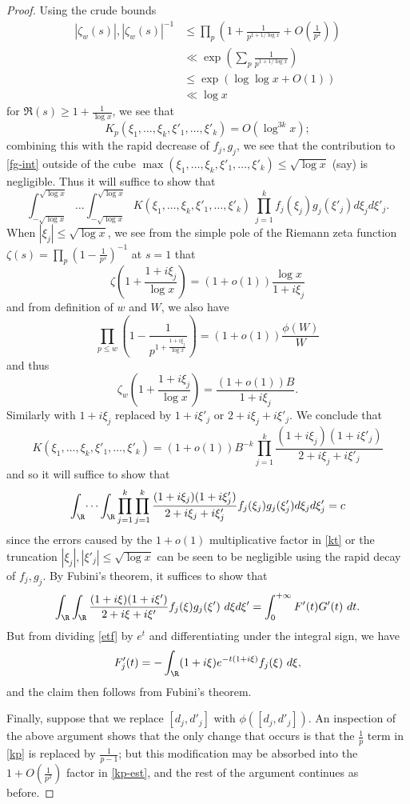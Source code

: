 \begin{proof}
Using the crude bounds
\begin{align*}
 |\zeta_w(s)|, |\zeta_w(s)|^{-1} &\leq \prod_p \left(1 + \frac{1}{p^{1+1/\log x}} + O\left(\frac{1}{p^2}\right)\right)\\
&\ll \exp\left( \sum_p \frac{1}{p^{1+1/\log x}} \right) \\
&\leq \exp( \log\log x + O(1) ) \\
&\ll \log x
\end{align*}
for $\Re(s) \geq 1 + \frac{1}{\log x}$, we see that
$$
 K_p(\xi_1,\dots,\xi_k,\xi'_1,\dots,\xi'_k) = O( \log^{3k} x );$$
combining this with the rapid decrease of $f_j, g_j$, we see that the contribution to \eqref{fg-int} outside of the cube $\max(\xi_1,\dots,\xi_k,\xi'_1,\dots,\xi'_k) \leq \sqrt{\log x}$ (say) is negligible.  Thus it will suffice to show that
$$
 \int_{-\sqrt{\log x}}^{\sqrt{\log x}} \dots \int_{-\sqrt{\log x}}^{\sqrt{\log x}} K(\xi_1,\dots,\xi_k,\xi'_1,\dots,\xi'_k)\ \prod_{j=1}^k f_j(\xi_j) g_j(\xi'_j) d\xi_j d\xi'_j.
$$
When $|\xi_j| \leq \sqrt{\log x}$, we see from the simple pole of the Riemann zeta function $\zeta(s) = \prod_p (1-\frac{1}{p^s})^{-1}$ at $s=1$ that
$$ \zeta\left(1 + \frac{1+i\xi_j}{\log x}\right) = (1+o(1)) \frac{\log x}{1+i\xi_j}$$
and from definition of $w$ and $W$, we also have
$$ \prod_{p \leq w} (1 - \frac{1}{p^{1+\frac{1+i\xi_j}{\log x}}}) = (1+o(1)) \frac{\phi(W)}{W}$$
and thus
$$ \zeta_w(1 + \frac{1+i\xi_j}{\log x}) = \frac{(1+o(1)) B}{1 + i\xi_j}.$$
Similarly with $1+i\xi_j$ replaced by $1+i\xi'_j$ or $2+i\xi_j+i\xi'_j$.  We conclude that
\begin{equation}\label{kt}
 K(\xi_1,\dots,\xi_k,\xi'_1,\dots,\xi'_k) = (1+o(1)) B^{-k} \prod_{j=1}^k \frac{(1+i\xi_j) (1+i\xi'_j)}{2+i\xi_j+i\xi'_j} 
\end{equation}
and so it will suffice to show that
$$
 \int_\R \dots \int_\R \prod_{j=1}^k \prod_{j=1}^k \frac{(1+i\xi_j) (1+i\xi'_j)}{2+i\xi_j+i\xi'_j}  f_j(\xi_j) g_j(\xi'_j) d\xi_j d\xi'_j
= c$$
since the errors caused by the $1+o(1)$ multiplicative factor in \eqref{kt} or the truncation $|\xi_j|, |\xi'_j| \leq \sqrt{\log x}$ can be seen to be negligible using the rapid decay of $f_j,g_j$.  By Fubini's theorem, it suffices to show that
$$ 
\int_\R \int_\R \frac{(1+i\xi) (1+i\xi')}{2+i\xi+i\xi'} f_j(\xi) g_j(\xi')\ d\xi d\xi' = \int_0^{+\infty} F'(t) G'(t)\ dt.$$
But from dividing \eqref{etf} by $e^t$ and differentiating under the integral sign, we have
$$F'_j(t) = - \int_\R (1+i\xi) e^{-t(1+i\xi)} f_j(\xi)\ d\xi,$$
and the claim then follows from Fubini's theorem.

Finally, suppose that we replace $[d_j,d'_j]$ with $\phi([d_j,d'_j])$.  An inspection of the above argument shows that the only change that occurs is that the $\frac{1}{p}$ term in \eqref{kp} is replaced by $\frac{1}{p-1}$; but this modification may be absorbed into the $1+O(\frac{1}{p^2})$ factor in \eqref{kp-est}, and the rest of the argument continues as before.
\end{proof}

